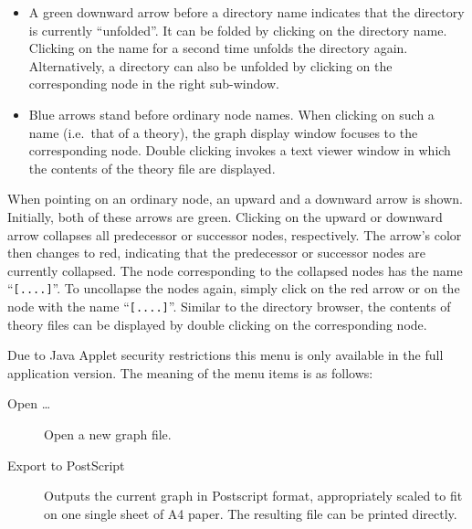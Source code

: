 \begin{isabellebody}
\begin{isamarkuptext}
\begin{itemize}
  \item A green downward arrow before a directory name indicates that
  the directory is currently ``unfolded''. It can be folded by
  clicking on the directory name.  Clicking on the name for a second
  time unfolds the directory again.  Alternatively, a directory can
  also be unfolded by clicking on the corresponding node in the right
  sub-window.
  
  \item Blue arrows stand before ordinary node names. When clicking on
  such a name (i.e.\ that of a theory), the graph display window
  focuses to the corresponding node. Double clicking invokes a text
  viewer window in which the contents of the theory file are
  displayed.

  \end{itemize}%
\end{isamarkuptext}%
\isamarkuptrue%
%
\isamarkuptrue%
%
\begin{isamarkuptext}%
When pointing on an ordinary node, an upward and a downward arrow is
  shown.  Initially, both of these arrows are green. Clicking on the
  upward or downward arrow collapses all predecessor or successor
  nodes, respectively. The arrow's color then changes to red,
  indicating that the predecessor or successor nodes are currently
  collapsed. The node corresponding to the collapsed nodes has the
  name ``\verb|[....]|''. To uncollapse the nodes again, simply
  click on the red arrow or on the node with the name ``\verb|[....]|''. Similar to the directory browser, the contents of
  theory files can be displayed by double clicking on the
  corresponding node.%
\end{isamarkuptext}%
\isamarkuptrue%
%
\isamarkuptrue%
%
\begin{isamarkuptext}%
Due to Java Applet security restrictions this menu is only available
  in the full application version. The meaning of the menu items is as
  follows:

  \begin{description}
  
  \item[Open \dots] Open a new graph file.
  
  \item[Export to PostScript] Outputs the current graph in Postscript
  format, appropriately scaled to fit on one single sheet of A4 paper.
  The resulting file can be printed directly.
  

\end{description}
\end{isamarkuptext}
\end{isabellebody}
